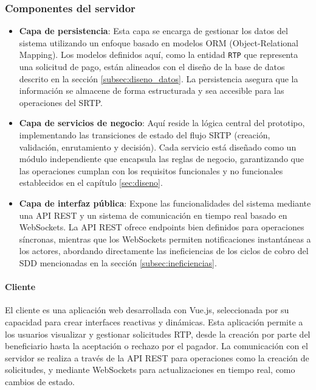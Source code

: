 \subsubsection{Componentes del servidor}
\label{subsec:componentes-del.serv}
\begin{itemize}
    \item \textbf{Capa de persistencia}: Esta capa se encarga de gestionar los datos del sistema utilizando un enfoque basado en modelos ORM (Object-Relational Mapping). Los modelos definidos aquí, como la entidad \texttt{RTP} que representa una solicitud de pago, están alineados con el diseño de la base de datos descrito en la sección \ref{subsec:diseno_datos}. La persistencia asegura que la información se almacene de forma estructurada y sea accesible para las operaciones del SRTP.
    
    \item \textbf{Capa de servicios de negocio}: Aquí reside la lógica central del prototipo, implementando las transiciones de estado del flujo SRTP (creación, validación, enrutamiento y decisión). Cada servicio está diseñado como un módulo independiente que encapsula las reglas de negocio, garantizando que las operaciones cumplan con los requisitos funcionales y no funcionales establecidos en el capítulo \ref{sec:diseno}.
    
    \item \textbf{Capa de interfaz pública}: Expone las funcionalidades del sistema mediante una API REST y un sistema de comunicación en tiempo real basado en WebSockets. La API REST ofrece endpoints bien definidos para operaciones síncronas, mientras que los WebSockets permiten notificaciones instantáneas a los actores, abordando directamente las ineficiencias de los ciclos de cobro del SDD mencionadas en la sección \ref{subsec:ineficiencias}.
\end{itemize}

\paragraph{Cliente}

El cliente es una aplicación web desarrollada con Vue.js, seleccionada por su capacidad para crear interfaces reactivas y dinámicas. Esta aplicación permite a los usuarios visualizar y gestionar solicitudes RTP, desde la creación por parte del beneficiario hasta la aceptación o rechazo por el pagador. La comunicación con el servidor se realiza a través de la API REST para operaciones como la creación de solicitudes, y mediante WebSockets para actualizaciones en tiempo real, como cambios de estado.

